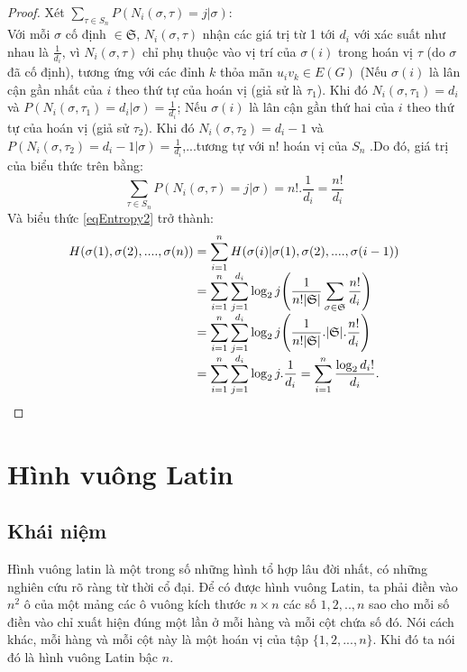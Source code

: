 \documentclass[a4paper, 12pt]{report}
\begin{document}
\begin{proof}
Xét $\displaystyle \sum_{\tau \in S_{n}}P(N_{i}(\sigma,\tau)=j | \sigma)$:\\
Với mỗi $\sigma$ cố định $\in \mathfrak{S}$, $N_{i}(\sigma,\tau)$ nhận các giá trị từ 1 tới $d_{i}$ với xác suất như nhau là $\frac{1}{d_{i}}$, vì $N_{i}(\sigma,\tau)$ chỉ phụ thuộc vào vị trí của $\sigma(i)$ trong hoán vị $\tau$ (do $\sigma$ đã cố định), tương ứng với các đỉnh $k$ thỏa mãn $u_{i}v_{k} \in E(G)$ (Nếu  $\sigma(i)$ là lân cận gần nhất của $i$ theo thứ tự của hoán vị (giả sử là $\tau_{1}$).  Khi đó $N_{i}(\sigma,\tau_{1}) = d_{i}$ và $P(N_{i}(\sigma,\tau_{1})=d_{i} | \sigma)=\frac{1}{d_{i}}$; Nếu  $\sigma(i)$ là lân cận gần thứ hai của $i$ theo thứ tự của hoán vị (giả sử $\tau_{2}$). Khi đó $N_{i}(\sigma,\tau_{2}) = d_{i}-1$ và $P(N_{i}(\sigma,\tau_{2})=d_{i}-1 | \sigma)=\frac{1}{d_{i}}$,...tương tự với n! hoán vị của $S_{n}$ .Do đó, giá trị của biểu thức trên bằng:
\begin{equation*}
    \displaystyle \sum_{\tau \in S_{n}}P(N_{i}(\sigma,\tau)=j | \sigma)=n!.\frac{1}{d_{i}} = \frac{n!}{d_{i}}
\end{equation*}
Và biểu thức \eqref{eqEntropy2} trở thành: 
\begin{equation*}
\begin{array}{l@{}l}
H(\sigma (1), \sigma (2), ....  ,\sigma (n)) 
&{}= \displaystyle \sum_{i=1}^{n}H(\sigma (i)| \sigma (1), \sigma (2), ....  ,\sigma (i-1)) \\
&{} =  \displaystyle \sum_{i=1}^{n}\displaystyle \sum_{j=1}^{d_{i}}\log_{2}j \Bigg(\frac{1}{n!|\mathfrak{S}|}\displaystyle \sum_{\sigma \in \mathfrak{S}}\frac{n!}{d_{i}} \Bigg) \\
 &{}= \displaystyle \sum_{i=1}^{n}\displaystyle \sum_{j=1}^{d_{i}}\log_{2}j \Bigg(\frac{1}{n!|\mathfrak{S}|}.|\mathfrak{S}|.\frac{n!}{d_{i}} \Bigg) \\
 &{}= \displaystyle \sum_{i=1}^{n}\displaystyle \sum_{j=1}^{d_{i}}\log_{2}j.\frac{1}{d_{i}} =\displaystyle \sum_{i=1}^{n} \frac{\log_{2}d_{i}!}{d_{i}}.  				\qedhere
\end{array}
\end{equation*}
\end{proof}

\chapter{Hình vuông Latin}
\section{Khái niệm}
Hình vuông latin là một trong số những hình tổ hợp lâu đời nhất, có những nghiên cứu rõ ràng từ thời cổ đại. Để có được hình vuông Latin, ta phải điền vào $n^{2}$ ô của một mảng các ô vuông kích thước $n \times n$ các số $1,2,..,n$ sao cho mỗi số điền vào chỉ xuất hiện đúng một lần ở mỗi hàng và mỗi cột chứa số đó. Nói cách khác, mỗi hàng và mỗi cột này là một hoán vị của tập $\{1,2,...,n\}$. Khi đó ta nói đó là hình vuông Latin bậc $n$.
\end{document}
